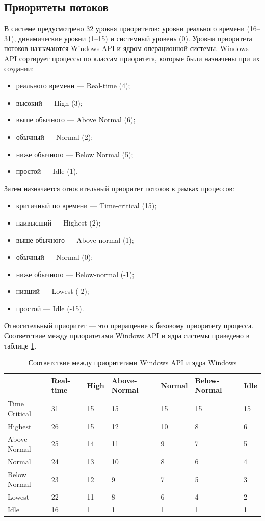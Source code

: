 \documentclass[a4paper,oneside,14pt]{extreport}
\begin{document}
	\subsection{Приоритеты потоков}
	В системе предусмотрено 32 уровня приоритетов: уровни реального времени (16--31), динамические уровни (1--15) и системный уровень (0). 
	Уровни приоритета потоков назначаются Windows API и ядром операционной системы.
	Windows API сортирует процессы по классам приоритета, которые были назначены при их создании:
	\begin{itemize}
		\item реального времени --- Real-time (4);
		\item высокий --- High (3);
		\item выше обычного --- Above Normal (6);
		\item обычный --- Normal (2);
		\item ниже обычного --- Below Normal (5);
		\item простой --- Idle (1).
	\end{itemize}
	Затем назначается относительный приоритет потоков в рамках процессов:
	\begin{itemize}
		\item критичный по времени --- Time-critical (15);
		\item наивысший --- Highest (2);
		\item выше обычного --- Above-normal (1);
		\item обычный --- Normal (0);
		\item ниже обычного --- Below-normal (-1);
		\item низший --- Lowest (-2);
		\item простой --- Idle (-15).
	\end{itemize}
	Относительный приоритет --- это приращение к базовому приоритету процесса.
	Соответствие между приоритетами Windows API и ядра системы приведено в таблице \ref{tbl:priority}.
	\begin{table}[H]
		\begin{center}
			\begin{tabular}{|l|p{45pt}|p{45pt}|p{45pt}|p{45pt}|p{45pt}|p{45pt}|} 
				\hline
				{} & Real-time & High & Above-Normal & Normal & Below-Normal & Idle\\
				\hline
				Time Critical & 31 & 15 & 15 & 15 & 15 & 15 \\
				\hline
				Highest & 26 & 15 & 12 & 10 & 8 & 6 \\
				\hline
				Above Normal & 25 & 14 & 11 & 9 & 7 & 5 \\
				\hline
				Normal & 24 & 13 & 10 & 8 & 6 & 4 \\
				\hline
				Below Normal & 23 & 12 & 9 & 7 & 5 & 3 \\
				\hline
				Lowest & 22 & 11 & 8 & 6 & 4 & 2 \\
				\hline
				Idle & 16 & 1 & 1 & 1 & 1 & 1 \\
				\hline
			\end{tabular}
		\end{center}
		\caption{Соответствие между приоритетами Windows API и ядра Windows}
		\label{tbl:priority}
	\end{table}
\end{document}
